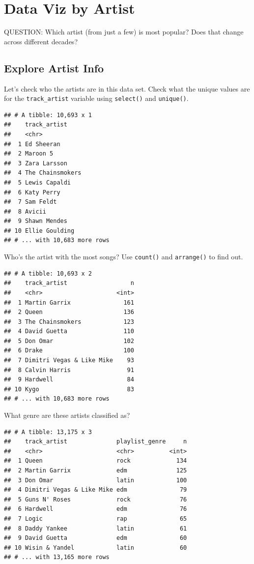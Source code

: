 \documentclass[
]{book}
\begin{document}
\hypertarget{data-viz-by-artist}{%
\section{Data Viz by Artist}\label{data-viz-by-artist}}

QUESTION: Which artist (from just a few) is most popular? Does that change across different decades?

\hypertarget{explore-artist-info}{%
\subsection{Explore Artist Info}\label{explore-artist-info}}

Let's check who the artists are in this data set. Check what the unique values are for the \texttt{track\_artist} variable using \texttt{select()} and \texttt{unique()}.

\begin{verbatim}
## # A tibble: 10,693 x 1
##    track_artist    
##    <chr>           
##  1 Ed Sheeran      
##  2 Maroon 5        
##  3 Zara Larsson    
##  4 The Chainsmokers
##  5 Lewis Capaldi   
##  6 Katy Perry      
##  7 Sam Feldt       
##  8 Avicii          
##  9 Shawn Mendes    
## 10 Ellie Goulding  
## # ... with 10,683 more rows
\end{verbatim}

Who's the artist with the most songs? Use \texttt{count()} and \texttt{arrange()} to find out.

\begin{verbatim}
## # A tibble: 10,693 x 2
##    track_artist                  n
##    <chr>                     <int>
##  1 Martin Garrix               161
##  2 Queen                       136
##  3 The Chainsmokers            123
##  4 David Guetta                110
##  5 Don Omar                    102
##  6 Drake                       100
##  7 Dimitri Vegas & Like Mike    93
##  8 Calvin Harris                91
##  9 Hardwell                     84
## 10 Kygo                         83
## # ... with 10,683 more rows
\end{verbatim}

What genre are these artists classified as?

\begin{verbatim}
## # A tibble: 13,175 x 3
##    track_artist              playlist_genre     n
##    <chr>                     <chr>          <int>
##  1 Queen                     rock             134
##  2 Martin Garrix             edm              125
##  3 Don Omar                  latin            100
##  4 Dimitri Vegas & Like Mike edm               79
##  5 Guns N' Roses             rock              76
##  6 Hardwell                  edm               76
##  7 Logic                     rap               65
##  8 Daddy Yankee              latin             61
##  9 David Guetta              edm               60
## 10 Wisin & Yandel            latin             60
## # ... with 13,165 more rows
\end{verbatim}
\end{document}
